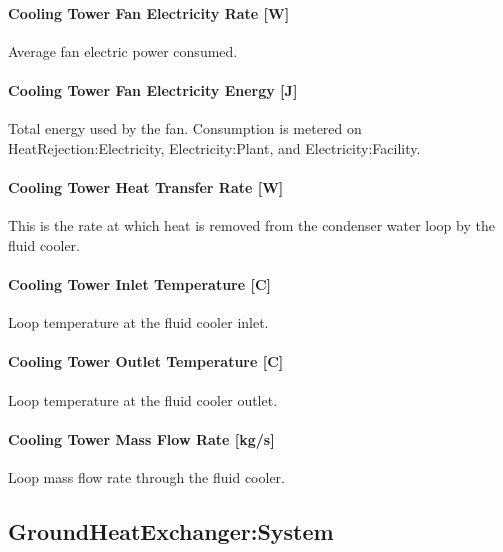 \paragraph{Cooling Tower Fan Electricity Rate {[}W{]}}\label{cooling-tower-fan-electric-power-w-7}

Average fan electric power consumed.

\paragraph{Cooling Tower Fan Electricity Energy {[}J{]}}\label{cooling-tower-fan-electric-energy-j-7}

Total energy used by the fan. Consumption is metered on HeatRejection:Electricity, Electricity:Plant, and Electricity:Facility.

\paragraph{Cooling Tower Heat Transfer Rate {[}W{]}}\label{cooling-tower-heat-transfer-rate-w-7}

This is the rate at which heat is removed from the condenser water loop by the fluid cooler.

\paragraph{Cooling Tower Inlet Temperature {[}C{]}}\label{cooling-tower-inlet-temperature-c-7}

Loop temperature at the fluid cooler inlet.

\paragraph{Cooling Tower Outlet Temperature {[}C{]}}\label{cooling-tower-outlet-temperature-c-7}

Loop temperature at the fluid cooler outlet.

\paragraph{Cooling Tower Mass Flow Rate {[}kg/s{]}}\label{cooling-tower-mass-flow-rate-kgs-7}

Loop mass flow rate through the fluid cooler.

\subsection{GroundHeatExchanger:System}\label{groundheatexchangersystem}

